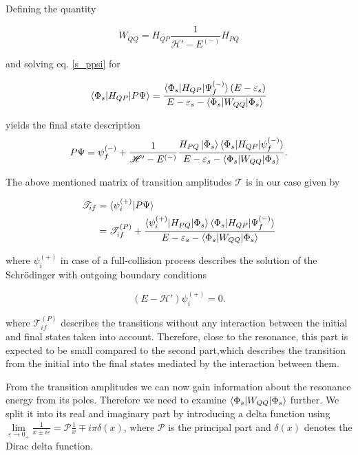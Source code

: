 Defining the quantity

\begin{equation}
  W_{QQ} = H_{QP}\frac{1}{\mathscr{H}' - E^{(-)}}H_{PQ}
\end{equation}

and solving eq. \ref{s_ppsi} for

\begin{equation}
  \braket{\Phi_s|H_{QP}|P\Psi} = \frac{\braket{\Phi_s|H_{QP}|\Psi_f^{(-)}}(E-\varepsilon_s)}
{E - \varepsilon_s - \braket{\Phi_s|W_{QQ}|\Phi_s}}
\end{equation}

yields the final state description
\begin{equation}\label{}
  P \Psi = \psi_f^{(-)} + \frac{1}{\mathscr{H}' - E^{(-)}}
           \frac{H_{PQ}\ket{\Phi_s}
           \braket{\Phi_s|H_{QP}|\psi_f^{(-)}}}
           {E - \varepsilon_s - \braket{\Phi_s|W_{QQ}|\Phi_s}} .
\end{equation}



The above mentioned matrix of transition amplitudes $\mathcal{T}$
is in our case given by


\begin{align}
  \mathscr{T}_{if} &= \braket{\psi_i^{(+)} | P\Psi} \\
                   &= \mathscr{T}_{if}^{(P)} + 
                     \frac{\braket{\psi_i^{(+)}|H_{PQ}|\Phi_s}
                           \braket{\Phi_s|H_{QP}|\Psi_f^{(-)}}}
                          {E-\varepsilon_s - \braket{\Phi_s|W_{QQ}|\Phi_s}}
\end{align}

where $\psi_i^{(+)}$ in case of a full-collision process describes
the solution of the Schrödinger with outgoing
boundary conditions

\begin{equation}                                                              
  (E - \mathscr{H}') \psi_i^{(+)} = 0 .                                       
\end{equation}

where $\mathscr{T}_{if}^{(P)}$ describes the transitions without any interaction
between the initial and final states taken into account. Therefore, close to   
the resonance, this part is expected to be small compared to the second part,which
describes the transition
from the initial into the final states mediated by the interaction between them.

From the transition amplitudes we can now gain information about
the resonance energy from its poles. Therefore we need to examine
$\braket{\Phi_s|W_{QQ}|\Phi_s}$ further.
We split it into
its real and imaginary part by introducing a delta function using 
$\lim\limits_{\varepsilon \to 0_+} \frac{1}{x \pm i\varepsilon}
 = \mathscr{P} \frac 1x \mp i\pi\delta(x)$,
where $\mathscr{P}$ is the principal part and $\delta(x)$ denotes the
Dirac delta function. \cite{Cohen-Tannoudji_3_2}

